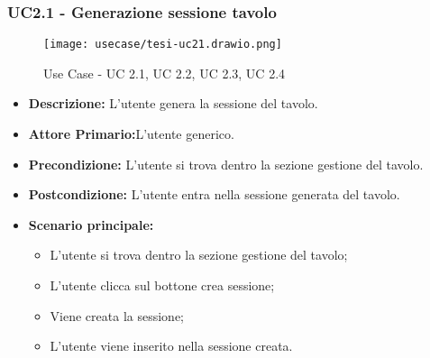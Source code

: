 \subsubsection{UC2.1 - Generazione sessione tavolo}
\begin{figure}[H]
    \centering
    \texttt{[image: usecase/tesi-uc21.drawio.png]}
    \caption{Use Case - UC 2.1, UC 2.2, UC 2.3, UC 2.4}
\end{figure}
\begin{itemize}
    \item \textbf{Descrizione:} L'utente genera la sessione del tavolo.
    \item \textbf{Attore Primario:}L'utente generico.
    \item \textbf{Precondizione:} L'utente si trova dentro la sezione gestione del tavolo.
    \item \textbf{Postcondizione:} L'utente entra nella sessione generata del tavolo.
    \item \textbf{Scenario principale:}
    \begin{itemize}
        \item L'utente si trova dentro la sezione gestione del tavolo;
        \item L'utente clicca sul bottone crea sessione;
        \item Viene creata la sessione;
        \item L'utente viene inserito nella sessione creata.
    \end{itemize}
\end{itemize}
